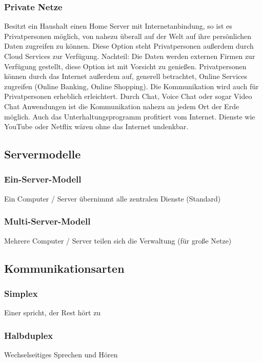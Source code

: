\documentclass[12pt,a4paper]{article}
\begin{document}
\subsubsection{Private Netze}
    Besitzt ein Haushalt einen Home Server mit Internetanbindung, so ist es Privatpersonen möglich, von nahezu überall auf der Welt auf ihre persönlichen Daten zugreifen zu können. Diese Option steht Privatpersonen außerdem durch Cloud Services zur Verfügung. Nachteil: Die Daten werden externen Firmen zur Verfügung gestellt, diese Option ist mit Vorsicht zu genießen. Privatpersonen können durch das Internet außerdem auf, generell betrachtet, Online Services zugreifen (Online Banking, Online Shopping). Die Kommunikation wird auch für Privatpersonen erheblich erleichtert. Durch Chat, Voice Chat oder sogar Video Chat Anwendungen ist die Kommunikation nahezu an jedem Ort der Erde möglich. Auch das Unterhaltungsprogramm profitiert vom Internet. Dienste wie YouTube oder Netflix wären ohne das Internet undenkbar.

\subsection{Servermodelle}

\subsubsection{Ein-Server-Modell}
    Ein Computer / Server übernimmt alle zentralen Dienste (Standard)

\subsubsection{Multi-Server-Modell}
    Mehrere Computer / Server teilen sich die Verwaltung (für große Netze)

\subsection{Kommunikationsarten}

\subsubsection{Simplex}
    Einer spricht, der Rest hört zu

\subsubsection{Halbduplex}
    Wechselseitiges Sprechen und Hören
\end{document}
